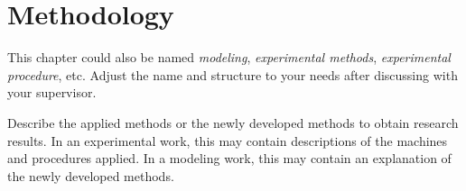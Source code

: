 \chapter{Methodology}
{
    \color{orange}
    This chapter could also be named \emph{modeling}, \emph{experimental methods}, \emph{experimental procedure}, etc.
    Adjust the name and structure to your needs after discussing with your supervisor.
    
    Describe the applied methods or the newly developed methods to obtain research results. 
    In an experimental work, this may contain descriptions of the machines and procedures applied. 
    In a modeling work, this may contain an explanation of the newly developed methods.
}